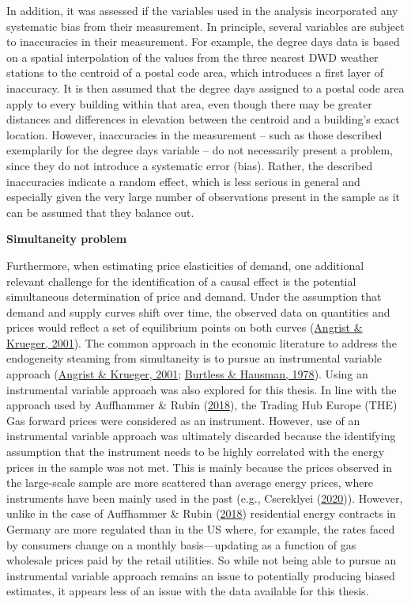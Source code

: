 \documentclass[12pt,twoside]{reedthesis}
\begin{document}
In addition, it was assessed if the variables used in the analysis incorporated any systematic bias from their measurement. In principle, several variables are subject to inaccuracies in their measurement. For example, the degree days data is based on a spatial interpolation of the values from the three nearest DWD weather stations to the centroid of a postal code area, which introduces a first layer of inaccuracy. It is then assumed that the degree days assigned to a postal code area apply to every building within that area, even though there may be greater distances and differences in elevation between the centroid and a building's exact location. However, inaccuracies in the measurement -- such as those described exemplarily for the degree days variable -- do not necessarily present a problem, since they do not introduce a systematic error (bias). Rather, the described inaccuracies indicate a random effect, which is less serious in general and especially given the very large number of observations present in the sample as it can be assumed that they balance out.

\textbf{Simultaneity problem}

Furthermore, when estimating price elasticities of demand, one additional relevant challenge for the identification of a causal effect is the potential simultaneous determination of price and demand. Under the assumption that demand and supply curves shift over time, the observed data on quantities and prices would reflect a set of equilibrium points on both curves (\protect\hyperlink{ref-angrist_krueger01}{Angrist \& Krueger, 2001}). The common approach in the economic literature to address the endogeneity steaming from simultaneity is to pursue an instrumental variable approach (\protect\hyperlink{ref-angrist_krueger01}{Angrist \& Krueger, 2001}; \protect\hyperlink{ref-burtless_hausman78}{Burtless \& Hausman, 1978}). Using an instrumental variable approach was also explored for this thesis. In line with the approach used by Auffhammer \& Rubin (\protect\hyperlink{ref-auffhammer_rubin18}{2018}), the Trading Hub Europe (THE) Gas forward prices were considered as an instrument. However, use of an instrumental variable approach was ultimately discarded because the identifying assumption that the instrument needs to be highly correlated with the energy prices in the sample was not met. This is mainly because the prices observed in the large-scale sample are more scattered than average energy prices, where instruments have been mainly used in the past (e.g., Csereklyei (\protect\hyperlink{ref-csereklyei20}{2020})). However, unlike in the case of Auffhammer \& Rubin (\protect\hyperlink{ref-auffhammer_rubin18}{2018}) residential energy contracts in Germany are more regulated than in the US where, for example, the rates faced by consumers change on a monthly basis---updating as a function of gas wholesale prices paid by the retail utilities. So while not being able to pursue an instrumental variable approach remains an issue to potentially producing biased estimates, it appears less of an issue with the data available for this thesis.
\end{document}
